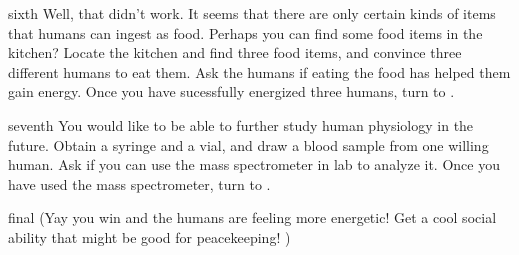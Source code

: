 \documentclass[notebook]{elementals} %
\begin{document}
\begin{page}{sixth}
 Well, that didn't work.  It seems that there are only certain kinds of items that humans can ingest as food.  Perhaps you can find some food items in the kitchen?  Locate the kitchen and find three food items, and convince three different humans to eat them.  Ask the humans if eating the food has helped them gain energy.  Once you have sucessfully energized three humans, turn to .
\end{page}

\begin{page}{seventh}
You would like to be able to further study human physiology in the future.  Obtain a syringe and a vial, and draw a blood sample from one willing human.  Ask \cGD{} if you can use the mass spectrometer in \cGD{\their} lab to analyze it.  Once you have used the mass spectrometer, turn to .
\end{page}

\begin{page}{final}
(Yay you win and the humans are feeling more energetic!  Get a cool social ability that might be good for peacekeeping! )
\end{page}

\endnotebook
\end{document}
